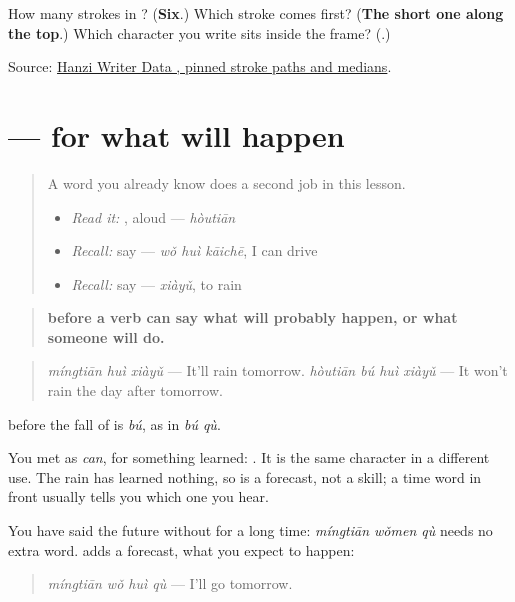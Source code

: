 \begin{tcolorbox}[breakable,colback=teal!4,colframe=teal!35!black,title={Before you move on}]
How many strokes in ? (\textbf{Six}.) Which stroke comes first? (\textbf{The short one along the top}.) Which character you write sits inside the frame? (\textbf{}.)

Source: \href{https://raw.githubusercontent.com/chanind/hanzi-writer-data/68d10a4b21150cae5e1ebbd223eed289cf32d90c/data/\%E5\%90\%8E.json}{Hanzi Writer Data , pinned stroke paths and medians}.
\end{tcolorbox}
\section[\texorpdfstring{\zh{明天会下雨} (míngtiān huì xiàyǔ)}{明天会下雨 (míngtiān huì xiàyǔ)}]{ —  for what will happen}

\label{lesson:ZH-C147-hui-future}



\begin{quote}
A word you already know does a second job in this lesson.

\begin{itemize}
\raggedright
  \item \emph{Read it:} , aloud — \emph{hòutiān}
  \item \emph{Recall:} say  — \emph{wǒ huì kāichē}, I can drive
  \item \emph{Recall:} say  — \emph{xiàyǔ}, to rain
\end{itemize}
\end{quote}

\begin{grammarlens}[title={Grammar Lens: \zh{会} before a verb, for what is going to happen}]
\begin{quote}
\textbf{ before a verb can say what will probably happen, or what someone will do.}
\end{quote}

\begin{quote}
\textbf{} \emph{míngtiān huì xiàyǔ} — It'll rain tomorrow. \textbf{} \emph{hòutiān bú huì xiàyǔ} — It won't rain the day after tomorrow.
\end{quote}

 before the fall of  is \emph{bú}, as in \emph{bú qù}.

You met  as \emph{can}, for something learned: . It is the same character in a different use. The rain has learned nothing, so  is a forecast, not a skill; a time word in front usually tells you which one you hear.

You have said the future without  for a long time: \textbf{} \emph{míngtiān wǒmen qù} needs no extra word.  adds a forecast, what you expect to happen:

\begin{quote}
\textbf{} \emph{míngtiān wǒ huì qù} — I'll go tomorrow.
\end{quote}
\end{grammarlens}

